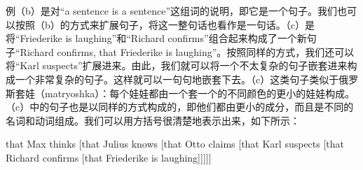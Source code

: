 例（b）是对“a sentence is a sentence”这组词的说明，即它是一个句子。我们也可以按照（b）的方式来扩展句子，将这一整句话也看作是一句话。（c）是将“Friederike is laughing”和“Richard confirms”组合起来构成了一个新句子“Richard confirms, that Friederike is laughing”。按照同样的方式，我们还可以将“Karl suspects”扩展进来。由此，我们就可以将一个不太复杂的句子嵌套进来构成一个非常复杂的句子。这样就可以一句句地嵌套下去。（c）这类句子类似于俄罗斯套娃（matryoshka）：每个娃娃都由一个套一个的不同颜色的更小的娃娃构成。（c）中的句子也是以同样的方式构成的，即他们都由更小的成分，而且是不同的名词和动词组成。我们可以用方括号很清楚地表示出来，如下所示：

\ea
\label{ex-that-max-thinks-that-recursion}
that Max thinks [that Julius knows [that Otto claims [that Karl suspects [that Richard confirms [that Friederike is laughing]]]]]
\z

